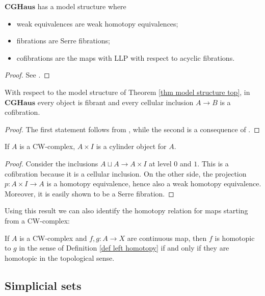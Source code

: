 \begin{refsection}
\begin{thm} \label{thm model structure top}
$\mathbf{CGHaus}$ has a model structure where
\begin{itemize}
\item weak equivalences are weak homotopy equivalences;
\item fibrations are Serre fibrations;
\item cofibrations are the maps with LLP with respect to acyclic fibrations.
\end{itemize}
\end{thm}

\begin{proof}
See \cite[Proposition 8.3]{dwsp}.
\end{proof}

\begin{prop}
With respect to the model structure of Theorem \ref{thm model structure top}, in $\mathbf{CGHaus}$ every object is fibrant and every cellular inclusion $A \to B$ is a cofibration.
\end{prop}

\begin{proof}
The first statement follows from \cite[Proposition 0.16]{hatcher}, while the second is a consequence of  \cite[Proposition 8.6]{dwsp}.
\end{proof}

\begin{prop}
If $A$ is a CW-complex, $A \times I$ is a cylinder object for $A$.
\end{prop}

\begin{proof}
Consider the inclusions $A \sqcup A \to A \times I$ at level $0$ and $1$. This is a cofibration because it is a cellular inclusion. On the other side, the projection $p \colon A \times I \to A$ is a homotopy equivalence, hence also a weak homotopy equivalence. Moreover, it is easily shown to be a Serre fibration.
\end{proof}

Using this result we can also identify the homotopy relation for maps starting from a CW-complex:

\begin{cor}
If $A$ is a CW-complex and $f,g \colon A \to X$ are continuous map, then $f$ is homotopic to $g$ in the sense of Definition \ref{def left homotopy} if and only if they are homotopic in the topological sense.
\end{cor}

\subsection{Simplicial sets}


\end{refsection}

